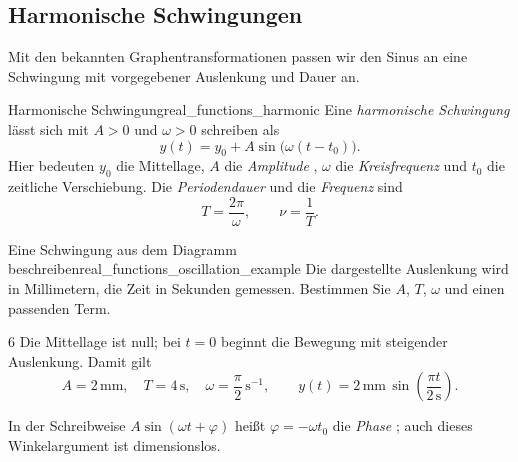 \clearpage
\subsection{Harmonische Schwingungen}
\label{subsec:real_functions_harmonic_oscillations}
Mit den bekannten Graphentransformationen passen wir den Sinus an
eine Schwingung mit vorgegebener Auslenkung und Dauer an.
\par\noindent\begin{minipage}{\linewidth}
\begin{DefinitionBox}{Harmonische Schwingung}{real_functions_harmonic}
  Eine \emph{harmonische Schwingung} 
  lässt sich mit $A>0$ und $\omega>0$ schreiben als
  \[
    y(t)=y_0+A\sin\bigl(\omega(t-t_0)\bigr).
  \]
  Hier bedeuten $y_0$ die Mittellage, $A$ die \emph{Amplitude}
  , $\omega$ die \emph{Kreisfrequenz}
   und $t_0$ die zeitliche Verschiebung.
  Die \emph{Periodendauer}  und die
  \emph{Frequenz}  sind
  \[
    T=\frac{2\pi}{\omega},\qquad \nu=\frac1T.
  \]
\end{DefinitionBox}
\begin{ExampleBox}[before skip=0.3\baselineskip]{Eine Schwingung aus dem Diagramm beschreiben}{real_functions_oscillation_example}
  Die dargestellte Auslenkung wird in Millimetern, die Zeit in Sekunden
  gemessen. Bestimmen Sie $A$, $T$, $\omega$ und einen passenden Term.
  \begin{center}
  \end{center}
  \begin{ClozeArea}[34]{6}
    Die Mittellage ist null; bei $t=0$ beginnt die Bewegung mit
    steigender Auslenkung. Damit gilt
    \[
      A=2\,\mathrm{mm},\quad T=4\,\mathrm{s},\quad
      \omega=\frac{\pi}{2}\,\mathrm{s}^{-1},\qquad
      y(t)=2\,\mathrm{mm}\,\sin\left(\frac{\pi t}{2\,\mathrm{s}}\right).
    \]
  \end{ClozeArea}
\end{ExampleBox}
\end{minipage}

In der Schreibweise $A\sin(\omega t+\varphi)$ heißt
$\varphi=-\omega t_0$ die \emph{Phase}
; auch dieses Winkelargument ist dimensionslos.

